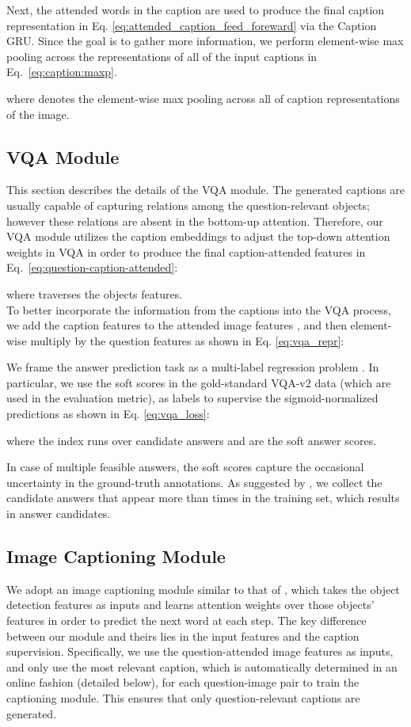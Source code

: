 \documentclass[11pt,a4paper]{article}
\begin{document}
Next, the attended words in the caption are used to produce the final caption representation in Eq. \ref{eq:attended_caption_feed_foreward} via the Caption GRU. Since the goal is to gather more information, we perform element-wise max pooling across the representations of all of the input captions  in Eq.\ \ref{eq:caption:maxp}.

where  denotes the element-wise max pooling across all of caption representations  of the image.

\subsection{VQA Module}
\label{sec:vqa}
This section describes the details of the VQA module. The generated captions are usually capable of capturing relations among the question-relevant objects; however these relations are absent in the bottom-up attention. Therefore, our VQA module utilizes the caption embeddings  to adjust the top-down attention weights in VQA in order to produce the final caption-attended features  in Eq.\ \ref{eq:question-caption-attended}:

where  traverses the  objects features.\\
To better incorporate the information from the captions into the VQA process, we add the caption features  to the attended image features , and then element-wise multiply by the question features as shown in Eq. \ref{eq:vqa_repr}:


We frame the answer prediction task as a multi-label regression problem \cite{anderson2017bottom}. In particular, we use the soft scores in the gold-standard VQA-v2 data (which are used in the evaluation metric), as labels to supervise the sigmoid-normalized predictions as shown in Eq. \ref{eq:vqa_loss}:

where the index  runs  over 
 candidate answers and  are the soft answer scores.

In case of multiple feasible answers, the soft scores capture the occasional uncertainty in the ground-truth annotations. As suggested by , we collect the candidate answers that appear more than  times in the training set, which results in  answer candidates. 

\subsection{Image Captioning Module}
\label{sec:ic}
We adopt an image captioning module similar to that of , which takes the object detection features as inputs and learns attention weights over those objects' features in order to predict the next word at each step. The key difference between our module and theirs lies in the input features and the caption supervision. Specifically, we use the question-attended image features  as inputs, and only use the most relevant caption, which is automatically determined in an online fashion (detailed below), for each question-image pair to train the captioning module. This ensures that only question-relevant captions are generated.\\
\end{document}
